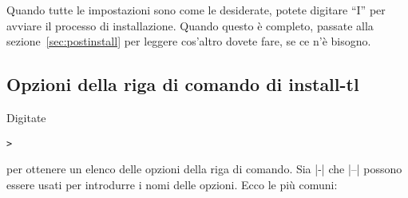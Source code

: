 \documentclass{article}
\begin{document}
Quando tutte le impostazioni sono come le desiderate, potete digitare
``I'' per avviare il processo di installazione. Quando questo è completo,
passate alla sezione~\ref{sec:postinstall} per leggere cos'altro dovete
fare, se ce n'è bisogno.


\subsection{Opzioni della riga di comando di install-tl}
\label{sec:cmdline}

Digitate
\begin{alltt}
> 
\end{alltt}
per ottenere un elenco delle opzioni della riga di comando. Sia |-| che
|--| possono essere usati per introdurre i nomi delle opzioni. Ecco le più
comuni:
\end{document}
